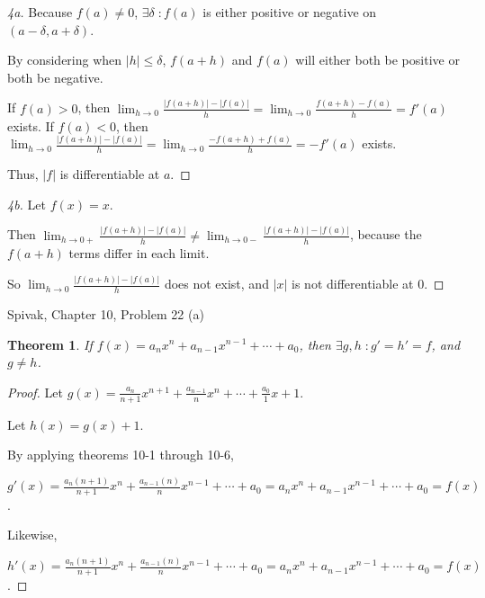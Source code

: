 \documentclass{article} %
\theoremstyle{plain}
\newtheorem*{theorem*}{Theorem}
\theoremstyle{definition}
\begin{document}
\begin{proof}[4a]
    Because $f(a) \neq 0$, $\exists \delta \; \colon f(a)$ is either positive or negative on $(a - \delta, a + \delta)$.

    By considering when $|h| \leq \delta$, $f(a+h)$ and $f(a)$ will either both be positive or both be negative.

    If $f(a) > 0$, then $\lim_{h \to 0} \frac{|f(a+h)| - |f(a)|}{h} = \lim_{h \to 0} \frac{f(a+h) - f(a)}{h} = f'(a)$ exists.
    If $f(a) < 0$, then $\lim_{h \to 0} \frac{|f(a+h)| - |f(a)|}{h} = \lim_{h \to 0} \frac{-f(a+h) + f(a)}{h} = -f'(a)$ exists.

    Thus, $|f|$ is differentiable at $a$.
\end{proof}
\begin{proof}[4b]
    Let $f(x) = x$.

    Then $\lim_{h \to 0+} \frac{|f(a+h)| - |f(a)|}{h} \neq \lim_{h \to 0-} \frac{|f(a+h)| - |f(a)|}{h}$, because the $f(a+h)$ terms differ in each limit.

    So $\lim_{h \to 0} \frac{|f(a+h)| - |f(a)|}{h}$ does not exist, and $|x|$ is not differentiable at $0$.
\end{proof}

    \noindent{} Spivak, Chapter 10, Problem 22 (a)

\begin{theorem*} 
    If $f(x) = a_n x^n + a_{n-1} x^{n-1} + \cdots + a_0$, then $\exists g,h \; \colon g' = h' = f$, and $g \neq h$.
\end{theorem*}

\begin{proof} 
    Let $g(x) = \frac{a_n}{n+1} x^{n+1} + \frac{a_{n-1}}{n} x^n + \cdots + \frac{a_0}{1} x + 1$.

    Let $h(x) = g(x) + 1$.

    By applying theorems 10-1 through 10-6,

    $g'(x) = \frac{a_n (n+1)}{n+1} x^n + \frac {a_{n-1} (n)}{n} x^{n-1} + \cdots + a_0 = a_n x^n + a_{n-1} x^{n-1} + \cdots + a_0 = f(x)$.

    Likewise,
    
    $h'(x) = \frac{a_n (n+1)}{n+1} x^n + \frac {a_{n-1} (n)}{n} x^{n-1} + \cdots + a_0 = a_n x^n + a_{n-1} x^{n-1} + \cdots + a_0 = f(x)$.
\end{proof}

    
\end{document}
